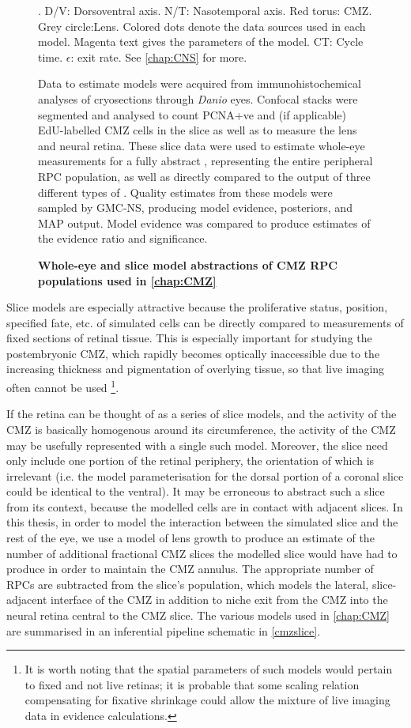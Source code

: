\begin{figure}[!h]
    \caption{{\bf Whole-eye and slice model abstractions of CMZ RPC populations used in \autoref{chap:CMZ}}}.
    \label{cmzslice}
    D/V: Dorsoventral axis. N/T: Nasotemporal axis. Red torus: CMZ. Grey circle:Lens. Colored dots denote the data sources used in each model. Magenta text gives the parameters of the model. CT: Cycle time. $\epsilon$: exit rate. See \autoref{chap:CNS} for more.

    Data to estimate models were acquired from immunohistochemical analyses of cryosections through \textit{Danio} eyes. Confocal stacks were segmented and analysed to count PCNA+ve and (if applicable) EdU-labelled CMZ cells in the slice as well as to measure the lens and neural retina. These slice data were used to estimate whole-eye measurements for a fully abstract , representing the entire peripheral RPC population, as well as directly compared to the output of three different types of . Quality estimates from these models were sampled by GMC-NS, producing model evidence, posteriors, and MAP output. Model evidence was compared to produce estimates of the evidence ratio and significance.
\end{figure}


Slice models are especially attractive because the proliferative status, position, specified fate, etc. of simulated cells can be directly compared to measurements of fixed sections of retinal tissue. This is especially important for studying the postembryonic CMZ, which rapidly becomes optically inaccessible due to the increasing thickness and pigmentation of overlying tissue, so that live imaging often cannot be used \footnote{It is worth noting that the spatial parameters of such models would pertain to fixed and not live retinas; it is probable that some scaling relation compensating for fixative shrinkage could allow the mixture of live imaging data in evidence calculations.}.

If the retina can be thought of as a series of slice models, and the activity of the CMZ is basically homogenous around its circumference, the activity of the CMZ may be usefully represented with a single such model. Moreover, the slice need only include one portion of the retinal periphery, the orientation of which is irrelevant (i.e. the model parameterisation for the dorsal portion of a coronal slice could be identical to the ventral). It may be erroneous to abstract such a slice from its context, because the modelled cells are in contact with adjacent slices. In this thesis, in order to model the interaction between the simulated slice and the rest of the eye, we use a model of lens growth to produce an estimate of the number of additional fractional CMZ slices the modelled slice would have had to produce in order to maintain the CMZ annulus. The appropriate number of RPCs are subtracted from the slice's population, which models the lateral, slice-adjacent interface of the CMZ in addition to niche exit from the CMZ into the neural retina central to the CMZ slice. The various models used in \autoref{chap:CMZ} are summarised in an inferential pipeline schematic in \autoref{cmzslice}.

